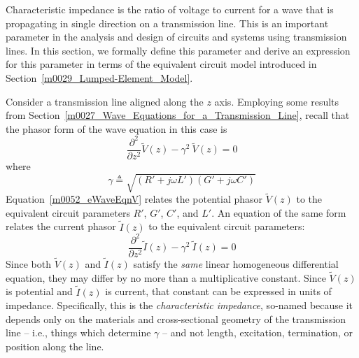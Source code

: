 

\label{m0052_Characteristic_Impedance} %

Characteristic impedance is the ratio of voltage to current for a wave that is propagating in single direction on a transmission line.
This is an important parameter in the analysis and design of circuits and systems using transmission lines.
In this section, we formally define this parameter and derive an expression for this parameter in terms of the equivalent circuit model introduced in Section~\ref{m0029_Lumped-Element_Model}. 

Consider a transmission line aligned along the $z$ axis.
Employing some results from Section~\ref{m0027_Wave_Equations_for_a_Transmission_Line}, recall that
the phasor form of the wave equation in this case is
%
\begin{equation}
\frac{\partial^2}{\partial z^2} \widetilde{V}(z) -\gamma^2~\widetilde{V}(z) =0
\label{m0052_eWaveEqnV}
\end{equation}
%
where
%
\begin{equation}
\gamma \triangleq \sqrt{\left( R' + j\omega L' \right)\left( G' + j\omega C' \right)} 
\label{m0052_egamma}
\end{equation}
%
Equation~\ref{m0052_eWaveEqnV} relates the potential phasor $\widetilde{V}(z)$ to the equivalent circuit parameters $R'$, $G'$, $C'$, and $L'$.
An equation of the same form relates the current phasor $\widetilde{I}(z)$ to the equivalent circuit parameters:
%
\begin{equation}
\frac{\partial^2}{\partial z^2} \widetilde{I}(z) -\gamma^2~\widetilde{I}(z) =0
\label{m0052_eWaveEqnI}
\end{equation}
%
Since both $\widetilde{V}(z)$ and $\widetilde{I}(z)$ satisfy the \emph{same} linear homogeneous differential equation, they may differ by no more than a multiplicative constant.
Since $\widetilde{V}(z)$ is potential and $\widetilde{I}(z)$ is current, that constant can be expressed in units of impedance.
Specifically, this is the \emph{characteristic impedance}, so-named because it depends only on the materials and cross-sectional geometry of the transmission line -- i.e., things which determine $\gamma$ -- and not length, excitation, termination, or position along the line. 

